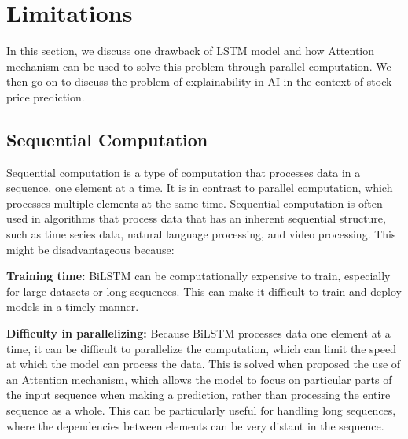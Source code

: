 \documentclass[a4paper]{article}
\begin{document}
\section{Limitations}

In this section, we discuss one drawback of LSTM model and how Attention mechanism can be used to solve this problem through parallel computation. We then go on to discuss the problem of explainability in AI in the context of stock price prediction.
\subsection{Sequential Computation}

Sequential computation is a type of computation that processes data in a sequence, one element at a time. It is in contrast to parallel computation, which processes multiple elements at the same time. Sequential computation is often used in algorithms that process data that has an inherent sequential structure, such as time series data, natural language processing, and video processing. This might be disadvantageous because:

\textbf{Training time:} BiLSTM can be computationally expensive to train, especially for large datasets or long sequences. This can make it difficult to train and deploy models in a timely manner.

\textbf{Difficulty in parallelizing:} Because BiLSTM processes data one element at a time, it can be difficult to parallelize the computation, which can limit the speed at which the model can process the data. This is solved when \cite{vaswani2017attention} proposed the use of an Attention mechanism, which allows the model to focus on particular parts of the input sequence when making a prediction, rather than processing the entire sequence as a whole. This can be particularly useful for handling long sequences, where the dependencies between elements can be very distant in the sequence.
\end{document}
